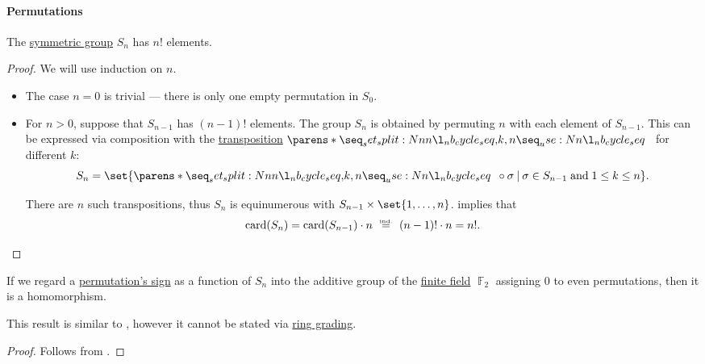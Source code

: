 \paragraph{Permutations}

\begin{proposition}\label{thm:symmetric_group_cardinality}
  The \hyperref[def:symmetric_group]{symmetric group} \( S_n \) has \( n! \) elements.
\end{proposition}
\begin{proof}
  We will use induction on \( n \).

  \begin{itemize}
    \item The case \( n = 0 \) is trivial --- there is only one empty permutation in \( S_0 \).

    \item For \( n > 0 \), suppose that \( S_{n - 1} \) has \( (n - 1)! \) elements. The group \( S_n \) is obtained by permuting \( n \) with each element of \( S_{n - 1} \). This can be expressed via composition with the \hyperref[def:transposition]{transposition} \( \cycle{ k, n } \) for different \( k \):
    \begin{equation*}
      S_n = \set{ \cycle{ k, n } \bincirc \sigma \given \sigma \in S_{n-1} \T{and} 1 \leq k \leq n }.
    \end{equation*}

    There are \( n \) such transpositions, thus \( S_n \) is equinumerous with \( S_{n-1} \times \set{ 1, \ldots, n } \).  implies that
    \begin{equation*}
      \card(S_n)
      =
      \card(S_{n-1}) \cdot n
      \reloset {\T{ind.}} =
      (n - 1)! \cdot n
      =
      n!.
    \end{equation*}
  \end{itemize}
\end{proof}

\begin{lemma}\label{thm:permutation_parity_homomorphism}
  If we regard a \hyperref[def:permutation_parity]{permutation's sign} as a function of \( S_n \) into the additive group of the \hyperref[def:finite_field]{finite field} \( \BbbF_2 \) assigning \( 0 \) to even permutations, then it is a homomorphism.
\end{lemma}
\begin{comments}
  \item This result is similar to , however it cannot be stated via \hyperref[def:graded_ring]{ring grading}.
\end{comments}
\begin{proof}
  Follows from .
\end{proof}

